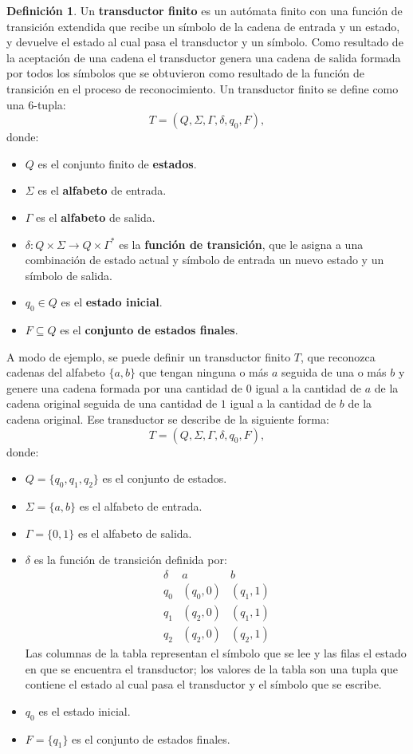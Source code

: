 \documentclass{report}
\theoremstyle{definition}
\newtheorem{definicion}{Definición}[chapter]
\theoremstyle{plain}
\theoremstyle{remark}
\begin{document}
\begin{definicion}
Un \textbf{transductor finito} es un autómata finito con una función de
transición extendida que recibe un símbolo de la cadena de entrada y un
estado, y devuelve el estado al cual pasa el transductor y un símbolo.
Como resultado de la aceptación de una cadena el transductor genera una
cadena de salida formada por todos los símbolos que se obtuvieron como
resultado de la función de transición en el proceso de reconocimiento.
Un transductor finito se define como una $6$-tupla:
\[
  T = (Q, \Sigma, \Gamma, \delta, q_0, F),
\]
donde:
\begin{itemize}
  \item $Q$ es el conjunto finito de \textbf{estados}.
  \item $\Sigma$ es el \textbf{alfabeto} de entrada.
  \item $\Gamma$ es el \textbf{alfabeto} de salida.
  \item $\delta : Q \times \Sigma \to Q \times \Gamma^*$ es la
    \textbf{función de transición}, que le asigna a una combinación de
    estado actual y símbolo de entrada un nuevo estado y un símbolo de
    salida.
  \item $q_0 \in Q$ es el \textbf{estado inicial}.
  \item $F \subseteq Q$ es el \textbf{conjunto de estados finales}.
\end{itemize}
\end{definicion}

A modo de ejemplo, se puede definir un transductor finito $T$, que
reconozca cadenas del alfabeto $\{a, b\}$ que tengan ninguna o más $a$
seguida de una o más $b$ y genere una cadena formada por una cantidad de
$0$ igual a la cantidad de $a$ de la cadena original seguida de una
cantidad de $1$ igual a la cantidad de $b$ de la cadena original. Ese
transductor se describe de la siguiente forma:
\[
  T = (Q, \Sigma, \Gamma, \delta, q_0, F),
\]
donde:
\begin{itemize}
  \item $Q = \{q_0, q_1, q_2\}$ es el conjunto de estados.
  \item $\Sigma = \{a, b\}$ es el alfabeto de entrada.
  \item $\Gamma = \{0, 1\}$ es el alfabeto de salida.
  \item $\delta$ es la función de transición definida por:
    \[
      \begin{array}{c|cc}
        \delta & a & b \\ \hline
        q_0 & (q_0, 0) & (q_1, 1) \\
        q_1 & (q_2, 0) & (q_1, 1) \\
        q_2 & (q_2, 0) & (q_2, 1)
      \end{array}
    \]
    Las columnas de la tabla representan el símbolo que se lee y las
    filas el estado en que se encuentra el transductor; los valores de
    la tabla son una tupla que contiene el estado al cual pasa el
    transductor y el símbolo que se escribe.
  \item $q_0$ es el estado inicial.
  \item $F = \{q_1\}$ es el conjunto de estados finales.
\end{itemize}
\end{document}
